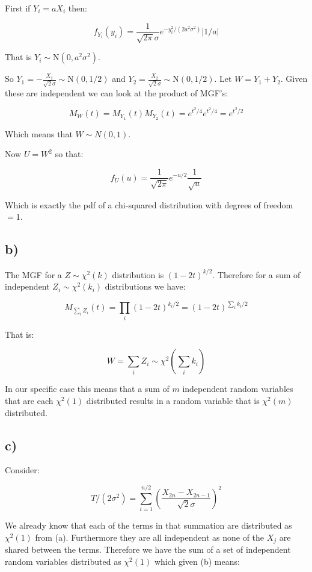 \documentclass[11pt]{article}
\begin{document}
First if $Y_i = aX_i$ then:

$$f_{Y_i}(y_i) = \frac{1}{\sqrt{2\pi} \sigma}e^{-y_i^2/(2a^2\sigma^2)}|1/a|$$

That is $Y_i \sim \text{N}(0, a^2\sigma^2)$. \newline

So $Y_1 = -\frac{X_1}{\sqrt{2}\sigma}\sim\text{N}(0, 1/2)$ and $Y_2 = \frac{X_2}{\sqrt{2}\sigma}\sim\text{N}(0, 1/2)$. Let $W=Y_1 + Y_2$. Given these are independent we can look at the product of MGF's:

$$M_W(t) = M_{Y_1}(t)M_{Y_2}(t)=e^{t^2/4}e^{t^2/4}=e^{t^2/2}$$

Which means that $W \sim N(0, 1)$. \newline

Now $U = W^2$ so that:

$$f_U(u) = \frac{1}{\sqrt{2\pi}}e^{-u/2} \frac{1}{\sqrt{u}}$$

Which is exactly the pdf of a chi-squared distribution with degrees of freedom $=1$. 

\subsection*{b)}


The MGF for a $Z \sim \chi^2(k)$ distribution is $(1-2t)^{k/2}$. Therefore for a sum of independent $Z_i \sim \chi^2(k_i)$ distributions we have:

$$M_{\sum_i Z_i}(t) = \prod_i (1-2t)^{k_i/2}=(1-2t)^{\sum_i k_i/2}$$

That is: 

$$W=\sum_i Z_i \sim \chi^2\left(\sum_i k_i\right)$$

In our specific case this means that a sum of $m$ independent random variables that are each $\chi^2(1)$ distributed results in a random variable that is $\chi^2(m)$ distributed. 

\subsection*{c)}

Consider:

$$T/(2\sigma^2)=\sum_{i=1}^{n/2}\left(\frac{X_{2n}-X_{2n-1}}{\sqrt{2}\sigma}\right)^2$$


We already know that each of the terms in that summation are distributed as $\chi^2(1)$ from (a). Furthermore they are all independent as none of the $X_j$ are shared between the terms. Therefore we have the sum of a set of independent random variables distributed as $\chi^2(1)$ which given (b) means:
\end{document}

